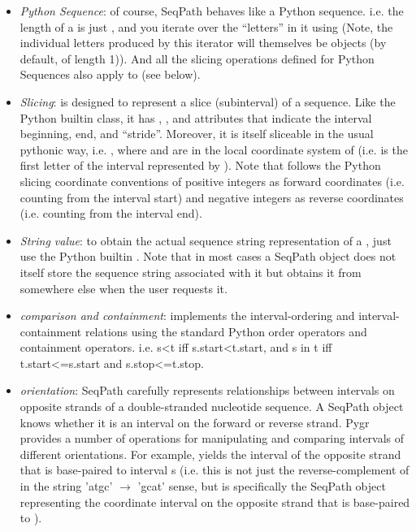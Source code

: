 \documentclass{howto}
\begin{document}
\begin{itemize}

\item    
{\em Python Sequence}: of course, SeqPath behaves like a Python sequence. i.e.
the length of a   is just , 
and you iterate over the ``letters'' in it using   
(Note, the individual letters produced by this iterator
will themselves be  objects (by default, of length 1)).  
And all the slicing
operations defined for Python Sequences also apply to 
 (see below).

\item    
{\em Slicing}:  is designed to represent a slice 
(subinterval) of a sequence.
Like the Python builtin  class, it has , 
, and  attributes that indicate 
the interval beginning, end, and ``stride''.
Moreover, it is itself sliceable in the usual pythonic way, 
i.e. ,
where  and  are in the local coordinate system of  
(i.e.  is the first letter of the interval represented by 
). Note that 
follows the Python slicing coordinate conventions of positive integers as
forward coordinates (i.e. counting from the interval start) and negative integers
as reverse coordinates (i.e. counting from the interval end).

\item    
{\em String value}: to obtain the actual sequence string representation
of a , just use the Python builtin .  
Note that in most cases
a SeqPath object does not itself store the sequence string associated with it
but obtains it from somewhere else when the user requests it.

\item
{\em comparison and containment}: 
implements the interval-ordering
and interval-containment relations using the standard Python order operators
and containment operators. i.e. s<t iff s.start<t.start, and s in t iff
t.start<=s.start and s.stop<=t.stop.

\item
{\em orientation}: SeqPath carefully represents relationships between intervals
on opposite strands of a double-stranded nucleotide sequence.  A SeqPath object
knows whether it is an interval on the forward or reverse strand.  Pygr provides
a number of operations for manipulating and comparing intervals of different
orientations.  For example,  yields the interval of the opposite strand that
is base-paired to interval s (i.e. this is not just the reverse-complement of 
in the string 'atgc' $\rightarrow$ 'gcat' sense, but is specifically the SeqPath
object representing the coordinate
interval on the opposite strand that is base-paired to ).


\end{itemize}
\end{document}
